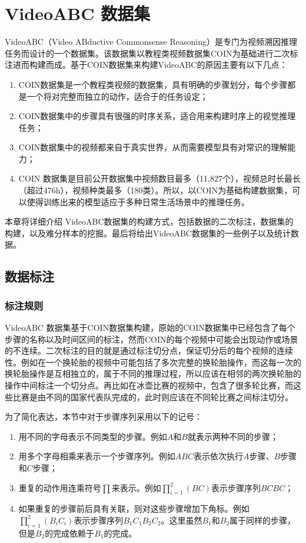 
\chapter{VideoABC 数据集}\label{cha:VideoABC}
VideoABC（Video ABductive Commonsense Reasoning）是专门为视频溯因推理任务而设计的一个数据集。该数据集以教程类视频数据集COIN\cite{tang2019coin}为基础进行二次标注进而构建而成。基于COIN数据集来构建VideoABC的原因主要有以下几点：
\begin{enumerate}
    \item COIN数据集是一个教程类视频的数据集，具有明确的步骤划分，每个步骤都是一个将对完整而独立的动作，适合于\VACR 的任务设定；
    \item COIN数据集中的步骤具有很强的时序关系，适合用来构建时序上的视觉推理任务；
    \item COIN数据集中的视频都来自于真实世界，从而需要模型具有对常识的理解能力；
    \item COIN 数据集是目前公开数据集中视频数目最多（11,827个），视频总时长最长（超过476h），视频种类最多（180类）。所以，以COIN为基础构建数据集，可以使得训练出来的模型适应于多种日常生活场景中的推理任务。
\end{enumerate}

本章将详细介绍 VideoABC数据集的构建方式，包括数据的二次标注，数据集的构建，以及难分样本的挖掘。最后将给出VideoABC数据集的一些例子以及统计数据。
\section{数据标注}
\subsection{标注规则}
VideoABC 数据集基于COIN数据集构建，原始的COIN数据集中已经包含了每个步骤的名称以及时间区间的标注，然而COIN的每个视频中可能会出现动作或场景的不连续。二次标注的目的就是通过标注切分点，保证切分后的每个视频的连续性。例如在一个换轮胎的视频中可能包括了多次完整的换轮胎操作，而这每一次的换轮胎操作是互相独立的，属于不同的推理过程，所以应该在相邻的两次换轮胎的操作中间标注一个切分点。再比如在冰壶比赛的视频中，包含了很多轮比赛，而这些比赛是由不同的国家代表队完成的，此时则应该在不同轮比赛之间标注切分。

为了简化表达，本节中对于步骤序列采用以下的记号：
\begin{enumerate}
    \item 用不同的字母表示不同类型的步骤。例如$A$和$B$就表示两种不同的步骤；
    \item 用多个字母相乘来表示一个步骤序列。例如$ABC$表示依次执行$A$步骤、$B$步骤和$C$步骤；
    \item 重复的动作用连乘符号$\prod$来表示。例如$\prod_{i=1}^{2}(BC)$表示步骤序列$BCBC$；
    \item 如果重复的步骤前后具有关联，则对这些步骤增加下角标。例如$\prod_{i=1}^{2}(B_iC_i)$表示步骤序列$B_1C_1B_2C_2$。这里虽然$B_1$和$B_2$属于同样的步骤，但是$B_2$的完成依赖于$B_1$的完成。
\end{enumerate}



